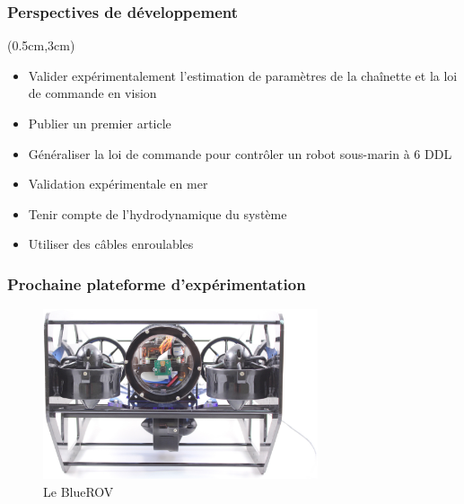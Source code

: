 \documentclass[10pt]{beamer}
\begin{document}
\begin{frame}
\frametitle{Perspectives de développement}
\begin{textblock*}{12cm}(0.5cm,3cm) %
\begin{itemize}
\item Valider expérimentalement l'estimation de paramètres de la chaînette et la loi de commande en vision
\item Publier un premier article
\item Généraliser la loi de commande pour contrôler un robot sous-marin à 6 DDL
\item Validation expérimentale en mer
\item Tenir compte de l'hydrodynamique du système
\item Utiliser des câbles enroulables
\end{itemize}
\end{textblock*}
\end{frame}

\begin{frame}
\frametitle{Prochaine plateforme d'expérimentation}
\begin{figure}
\includegraphics[height= 5cm]{Pictures/blueRov.jpg}
\caption{Le BlueROV}
\end{figure}
\end{frame}
\end{document}
